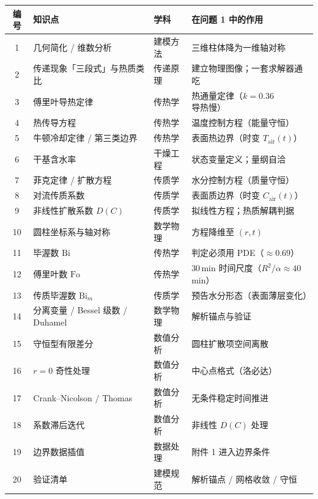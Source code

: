 \documentclass[12pt,a4paper]{ctexart}
\begin{document}
\begin{center}
\small
\begin{tabular}{clll}
\toprule
编号 & 知识点 & 学科 & 在问题 1 中的作用 \\
\midrule
1 & 几何简化 / 维数分析 & 建模方法 & 三维柱体降为一维轴对称 \\
2 & 传递现象「三段式」与热质类比 & 传递原理 & 建立物理图像；一套求解器通吃 \\
3 & 傅里叶导热定律 & 传热学 & 热通量定律（$k=0.36$ 导热慢） \\
4 & 热传导方程 & 传热学 & 温度控制方程（能量守恒） \\
5 & 牛顿冷却定律 / 第三类边界 & 传热学 & 表面热边界（时变 $T_{\mathrm{air}}(t)$） \\
6 & 干基含水率 & 干燥工程 & 状态变量定义；量纲自洽 \\
7 & 菲克定律 / 扩散方程 & 传质学 & 水分控制方程（质量守恒） \\
8 & 对流传质系数 & 传质学 & 表面质边界（时变 $C_{\mathrm{air}}(t)$） \\
9 & 非线性扩散系数 $D(C)$ & 传质学 & 拟线性方程；热质解耦判据 \\
10 & 圆柱坐标系与轴对称 & 数学物理 & 方程降维至 $(r,t)$ \\
11 & 毕渥数 $\mathrm{Bi}$ & 传热学 & 判定必须用 PDE（$\approx0.69$） \\
12 & 傅里叶数 $\mathrm{Fo}$ & 传热学 & 30\,min 时间尺度（$R^2/\alpha\approx40$\,min） \\
13 & 传质毕渥数 $\mathrm{Bi}_m$ & 传质学 & 预告水分形态（表面薄层变化） \\
14 & 分离变量 / Bessel 级数 / Duhamel & 数学物理 & 解析锚点与验证 \\
15 & 守恒型有限差分 & 数值分析 & 圆柱扩散项空间离散 \\
16 & $r=0$ 奇性处理 & 数值分析 & 中心点格式（洛必达） \\
17 & Crank--Nicolson / Thomas & 数值分析 & 无条件稳定时间推进 \\
18 & 系数滞后迭代 & 数值分析 & 非线性 $D(C)$ 处理 \\
19 & 边界数据插值 & 数据处理 & 附件 1 进入边界条件 \\
20 & 验证清单 & 建模规范 & 解析锚点 / 网格收敛 / 守恒 \\
\bottomrule
\end{tabular}
\end{center}
\end{document}
